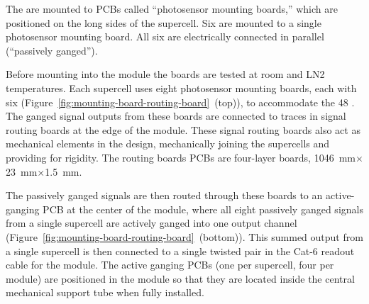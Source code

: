 The  are mounted to PCBs called ``photosensor mounting boards,'' which are positioned on the long sides of the supercell.  
Six  are mounted to a single photosensor mounting board.  All six are electrically connected in parallel (``passively ganged'').


 Before mounting into the  module the boards are tested at room and LN2 temperatures. 
 Each supercell uses eight photosensor mounting boards, each with six  (Figure~\ref{fig:mounting-board-routing-board}~(top)), %
 to accommodate the 48 .  The ganged signal outputs from these boards are connected to traces in signal routing boards at the edge of the  module. These signal routing boards also act as mechanical elements in the design, mechanically joining the supercells and providing for rigidity.  The routing boards PCBs are four-layer boards, \SI{1046}{mm}$\times$\SI{23}{mm}$\times$\SI{1.5}{mm}.

The passively ganged signals are then routed through these boards to an active-ganging PCB at the center of the module, where all eight passively ganged signals from a single supercell are actively ganged into one output channel (Figure~\ref{fig:mounting-board-routing-board}~(bottom)). This summed output from a single supercell is then connected to a single twisted pair in the Cat-6 readout cable for the module.  The active ganging PCBs (one per supercell, four per module) are positioned in the module so that they are located inside the central  mechanical support tube when fully installed.


